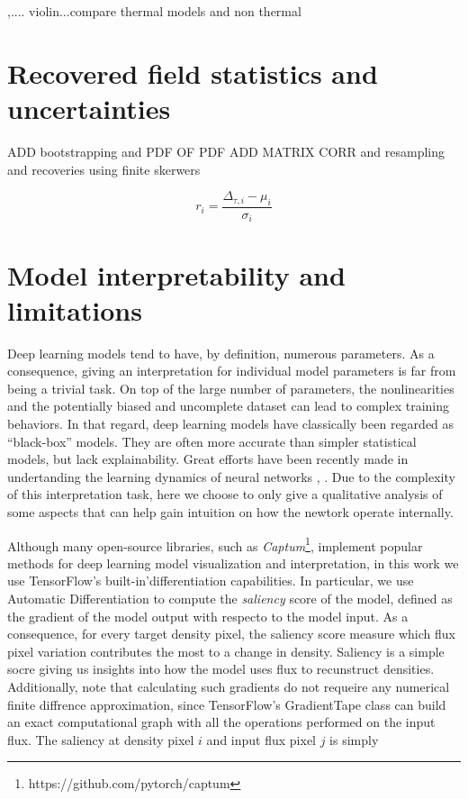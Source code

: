  ,.... violin...compare thermal models and non thermal










\section{Recovered field statistics and uncertainties}\label{sec:recovered statistics}
ADD bootstrapping and PDF OF PDF
ADD MATRIX CORR and resampling and recoveries using finite skerwers

\begin{equation}\label{eq: residuals}
    r_i=\frac{\Delta_{\tau,i}-\mu_i}{\sigma_i}
\end{equation}



\section{Model interpretability and limitations}
Deep learning models tend to have, by definition, numerous parameters. As a consequence, giving an interpretation for individual model parameters is far from being a trivial task. On top of the large number of parameters, the nonlinearities and the potentially biased and uncomplete dataset can lead to complex training behaviors. In that regard, deep learning models have classically been regarded as ``black-box'' models. They are often more accurate than simpler statistical models, but lack explainability. Great efforts have been recently made in undertanding the learning dynamics of neural networks \cite{shwartzziv2017opening}, \cite{buhrmester2019analysis}.
Due to the complexity of this interpretation task, here we choose to only give a qualitative analysis of some aspects that can help gain intuition on how the newtork operate internally.

Although many open-source libraries, such as \textit{Captum}\footnote{https://github.com/pytorch/captum}, implement popular methods for deep learning model visualization and interpretation, in this work we use TensorFlow's built-in'differentiation capabilities. In particular, we use Automatic Differentiation to compute the \textit{saliency} score of the model, defined as the gradient of the model output with respecto to the model input. As a consequence, for every target density pixel, the saliency score measure which flux pixel variation contributes the most to a change in density. Saliency is a simple socre giving us insights into how the model uses flux to recunstruct densities. Additionally, note that calculating such gradients do not requeire any numerical finite diffrence approximation, since TensorFlow's GradientTape class can build an exact computational graph with all the operations performed on the input flux. The saliency at density pixel $i$ and input flux pixel $j$ is simply

